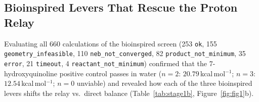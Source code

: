 \documentclass[11pt,a4paper]{article}
\begin{document}
\subsection{Bioinspired Levers That Rescue the Proton Relay}
Evaluating all 660 calculations of the bioinspired screen (253 \texttt{ok}, 155 \texttt{geometry\_infeasible}, 110 \texttt{neb\_not\_converged}, 82 \texttt{product\_not\_minimum}, 35 \texttt{error}, 21 \texttt{timeout}, 4 \texttt{reactant\_not\_minimum}) confirmed that the 7-hydroxyquinoline positive control passes in water ($n=2$: $20.79$\,kcal\,mol$^{-1}$; $n=3$: $12.54$\,kcal\,mol$^{-1}$; $n=0$ unviable) and revealed how each of the three bioinspired levers shifts the relay vs.\ direct balance (Table~\ref{tab:stage1b}, Figure~\ref{fig:fig1}b).

\begin{table}[htbp]
\centering
\caption{Selected pilot diagnostic bioinspired screening results (GFN2-xTB/ALPB median barriers $\Delta E_{\text{act}}$ across $k \ge 2$ of $N_{\text{seed}} = 3$ usable seeds, kcal\,mol$^{-1}$) across held-off bases at fixed distance $d$, bifunctional shuttles on cyclohexa-2,4-dien-1-one $\to$ phenol, the \textit{all-cis} cyclohexane-1,3,5-triol wire, and the 7-hydroxyquinoline control.}
\label{tab:stage1b}
\footnotesize
\setlength{\tabcolsep}{4pt}
\end{table}
\end{document}
